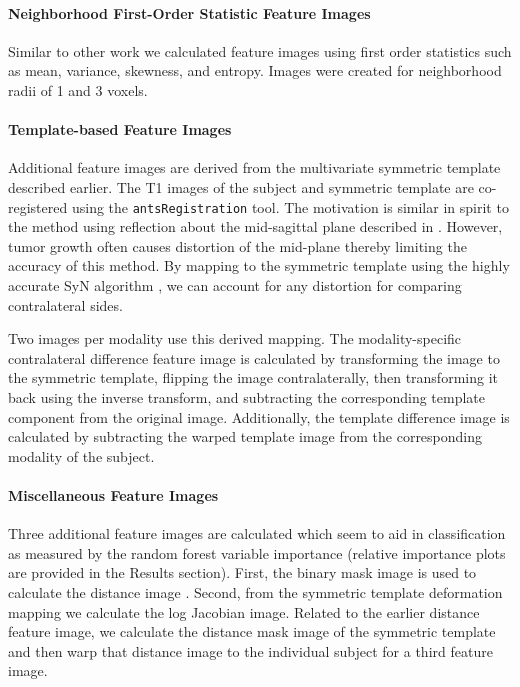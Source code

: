 \documentclass[final,5p,times,twocolumn]{elsarticle}
\begin{document}
\paragraph{Neighborhood First-Order Statistic Feature Images}
Similar to other work \cite{bauer2012,zikic2012} we calculated
feature images using first order statistics such as mean, 
variance, skewness, and entropy.  Images were created for 
neighborhood radii of 1 and 3 voxels.

\paragraph{Template-based Feature Images}
Additional feature images are derived from the multivariate 
symmetric template described earlier. The T1 images of the 
subject and symmetric template are co-registered 
\citep{tustison2013a} using the {\tt antsRegistration} 
tool.  The motivation is similar in spirit to the method
using reflection about the mid-sagittal plane described in 
\cite{geremia2012}.  However, tumor growth often causes 
distortion of the mid-plane thereby limiting the accuracy of
this method.  By mapping to the symmetric template using the
highly accurate SyN algorithm \cite{avants2011a}, we can 
account for any distortion for comparing contralateral
sides.

Two images per modality use this derived mapping.  The modality-specific
contralateral difference feature image is calculated by transforming
the image to the symmetric template, flipping the image contralaterally,
then transforming it back using the inverse transform, and subtracting
the corresponding template component from the original image.  Additionally, 
the template difference image is calculated by subtracting the warped template 
image from the corresponding modality of the subject.

\paragraph{Miscellaneous Feature Images}
Three additional feature images are calculated which seem to aid in 
classification as measured by the random forest variable importance
(relative importance plots are provided in the Results section).
First, the binary mask image is used to calculate the distance image 
\citep{maurer2003}.  Second, from the symmetric template deformation 
mapping we calculate the log Jacobian image.  Related to the earlier
distance feature image, we calculate the distance mask image of the symmetric
template and then warp that distance image to the individual subject
for a third feature image.
\end{document}
